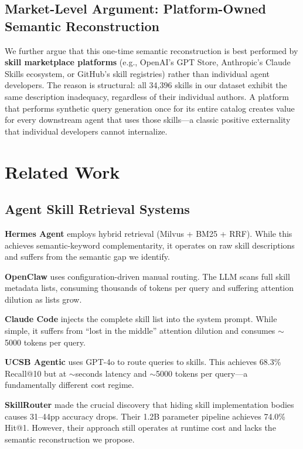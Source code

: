 \documentclass[11pt,a4paper]{article}
\begin{document}
\subsection{Market-Level Argument: Platform-Owned Semantic Reconstruction}

We further argue that this one-time semantic reconstruction is best performed by \textbf{skill marketplace platforms} (e.g., OpenAI's GPT Store, Anthropic's Claude Skills ecosystem, or GitHub's skill registries) rather than individual agent developers. The reason is structural: all 34,396 skills in our dataset exhibit the same description inadequacy, regardless of their individual authors. A platform that performs synthetic query generation once for its entire catalog creates value for every downstream agent that uses those skills---a classic positive externality that individual developers cannot internalize.

\section{Related Work}
\label{sec:related-work}

\subsection{Agent Skill Retrieval Systems}

\textbf{Hermes Agent} \citep{hermes2025} employs hybrid retrieval (Milvus + BM25 + RRF). While this achieves semantic-keyword complementarity, it operates on raw skill descriptions and suffers from the semantic gap we identify.

\textbf{OpenClaw} \citep{openclaw2025} uses configuration-driven manual routing. The LLM scans full skill metadata lists, consuming thousands of tokens per query and suffering attention dilution as lists grow.

\textbf{Claude Code} \citep{claudecode2025} injects the complete skill list into the system prompt. While simple, it suffers from ``lost in the middle'' attention dilution and consumes $\sim$5000 tokens per query.

\textbf{UCSB Agentic} \citep{ucsb2026} uses GPT-4o to route queries to skills. This achieves 68.3\% Recall@10 but at $\sim$seconds latency and $\sim$5000 tokens per query---a fundamentally different cost regime.

\textbf{SkillRouter} \citep{skillrouter2026} made the crucial discovery that hiding skill implementation bodies causes 31--44pp accuracy drops. Their 1.2B parameter pipeline achieves 74.0\% Hit@1. However, their approach still operates at runtime cost and lacks the semantic reconstruction we propose.
\end{document}
